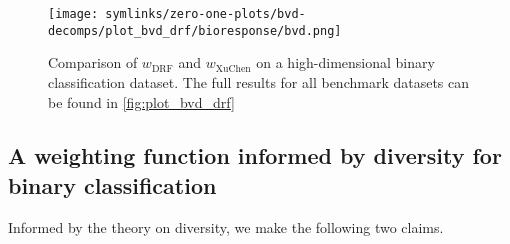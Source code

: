 \documentclass[../main.tex]{subfiles}
\begin{document}





\begin{figure*}
    \texttt{[image: symlinks/zero-one-plots/bvd-decomps/plot\_bvd\_drf/bioresponse/bvd.png]}
    \caption{
        Comparison of $w_\text{DRF}$ and $w_\text{XuChen}$ on a high-dimensional binary classification dataset.
        The full results for all benchmark datasets can be found in \cref{fig:plot_bvd_drf}
        \bvdlegend
    }
    \label{fig:drf-comparison}
\end{figure*}

\subsection{A weighting function informed by diversity for binary classification}
\label{sec:binary}
Informed by the theory on diversity, we make the following two claims.
\end{document}
